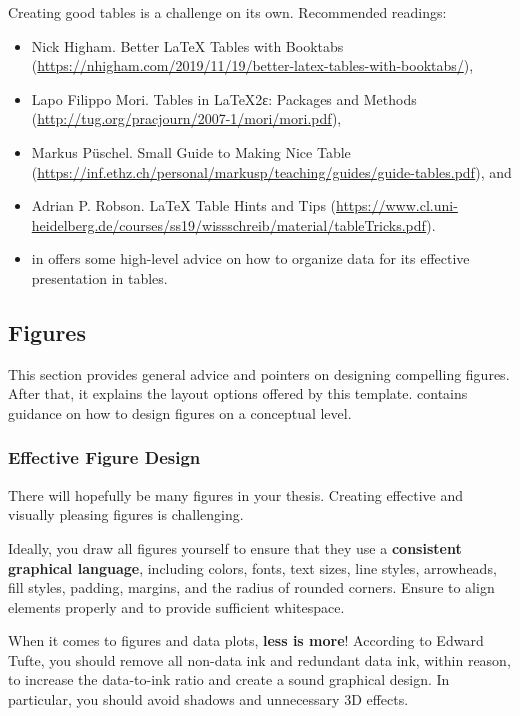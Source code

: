 Creating good tables is a challenge on its own. Recommended readings: 
\begin{itemize}
\item Nick Higham. Better LaTeX Tables with Booktabs (\url{https://nhigham.com/2019/11/19/better-latex-tables-with-booktabs/}),
\item Lapo Filippo Mori. Tables in \LaTeX{}2ε: Packages and Methods (\url{http://tug.org/pracjourn/2007-1/mori/mori.pdf}),
\item Markus Püschel. Small Guide to Making Nice Table (\url{https://inf.ethz.ch/personal/markusp/teaching/guides/guide-tables.pdf}), and
\item Adrian P. Robson. \LaTeX{} Table Hints and Tips (\url{https://www.cl.uni-heidelberg.de/courses/ss19/wissschreib/material/tableTricks.pdf}).
\item {} in  offers some high-level advice on how to organize data for its effective presentation in tables.
\end{itemize}

\subsection{Figures}

This section provides general advice and pointers on designing compelling figures. After that, it explains the layout options offered by this template.  contains guidance on how to design figures on a conceptual level.

\subsubsection{Effective Figure Design}

There will hopefully be many figures in your thesis. Creating effective and visually pleasing figures is challenging.

Ideally, you draw all figures yourself to ensure that they use a \textbf{consistent graphical language}, including colors, fonts, text sizes, line styles, arrowheads, fill styles, padding, margins, and the radius of rounded corners. Ensure to align elements properly and to provide sufficient whitespace.

When it comes to figures and data plots, \textbf{less is more}! According to Edward Tufte,%
you should remove all non-data ink and redundant data ink, within reason, to increase the data-to-ink ratio and create a sound graphical design. In particular, you should avoid shadows and unnecessary 3D effects.

